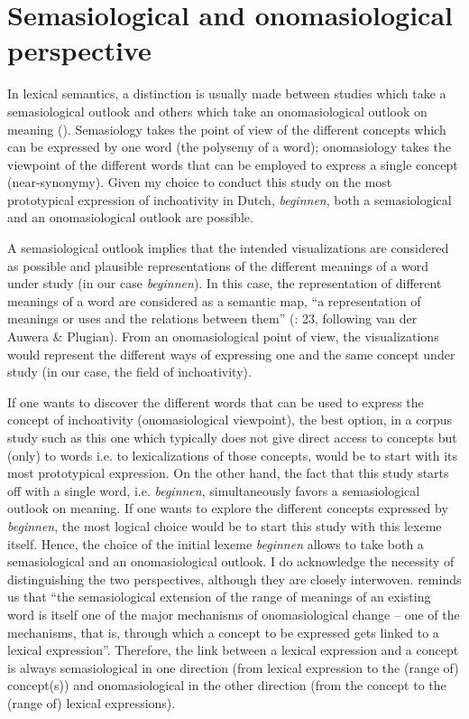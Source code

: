 \section{\label{sec:3.2}  Semasiological and onomasiological perspective} 

In lexical semantics, a distinction is usually made between studies which take a semasiological outlook and others which take an onomasiological outlook on meaning (\citealt{geeraerts_structure_1994}). Semasiology takes the point of view of the different concepts which can be expressed by one word (the polysemy of a word); onomasiology takes the viewpoint of the different words that can be employed to express a single concept (near-synonymy). Given my choice to conduct this study on the most prototypical expression of inchoativity in Dutch, \textit{beginnen}, both a semasiological and an onomasiological outlook are possible.



A semasiological outlook implies that the intended visualizations are considered as possible and plausible representations of the different meanings of a word under study (in our case \textit{beginnen}). In this case, the representation of different meanings of a word are considered as a semantic map, “a representation of meanings or uses and the relations between them” (\citealt{simon-vandenbergen_semantic_2007}: 23, following van der Auwera \& Plugian). From an onomasiological point of view, the visualizations would represent the different ways of expressing one and the same concept under study (in our case, the field of inchoativity).



If one wants to discover the different words that can be used to express the concept of inchoativity (onomasiological viewpoint), the best option, in a corpus study such as this one which typically does not give direct access to concepts but (only) to words i.e. to lexicalizations of those concepts, would be to start with its most prototypical expression. On the other hand, the fact that this study starts off with a single word, i.e. \textit{beginnen}, simultaneously favors a semasiological outlook on meaning. If one wants to explore the different concepts expressed by \textit{beginnen}, the most logical choice would be to start this study with this lexeme itself. Hence, the choice of the initial lexeme \textit{beginnen} allows to take both a semasiological and an onomasiological outlook. I do acknowledge the necessity of distinguishing the two perspectives, although they are closely interwoven. \citet[30]{geeraerts_theories_2010} reminds us that “the semasiological extension of the range of meanings of an existing word is itself one of the major mechanisms of onomasiological change – one of the mechanisms, that is, through which a concept to be expressed gets linked to a lexical expression”. Therefore, the link between a lexical expression and a concept is always semasiological in one direction (from lexical expression to the (range of) concept(s)) and onomasiological in the other direction (from the concept to the (range of) lexical expressions).



